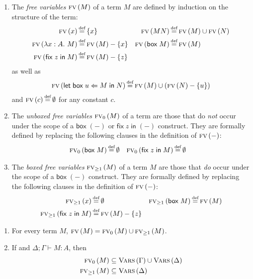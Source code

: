 \documentclass[11pt]{entcs}
\newcommand{\defeq}{\stackrel{\mathclap{\mbox{\tiny def}}}{=}}
\newcommand{\ctxt}[2]{#1\mathbin{;}#2}
\newcommand{\ibox}[1]{\mathsf{box\;}#1}
\newcommand{\letbox}[3]{\mathsf{let\;box\;} #1 \Leftarrow #2 \mathsf{\;in\;} #3}
\newcommand{\fixlob}[2]{\mathsf{fix\;} #1 \mathsf{\;in\;} #2}
\newcommand{\fv}[1]{\textsc{fv}\left(#1\right)}
\newcommand{\ufv}[1]{\textsc{fv}_0\left(#1\right)}
\newcommand{\bfv}[1]{\textsc{fv}_{\geq 1}\left(#1\right)}
\newcommand{\vars}[1]{\textsc{Vars}\left(#1\right)}
\begin{document}
\begin{defn} \hfill
  \begin{enumerate}
    \item The \emph{free variables} $\fv{M}$ of a term
    $M$ are defined by induction on the structure of the term:
    \begin{align*}
      \fv{x}  &\defeq \{x\} &
      \fv{MN} &\defeq \fv{M} \cup \fv{N} \\
      \fv{\lambda x : A.\ M} &\defeq \fv{M} - \{x\} &
      \fv{\ibox{M}} &\defeq \fv{M} \\
      \fv{\fixlob{z}{M}} &\defeq \fv{M} - \{z\}
    \end{align*}
    as well as \[
      \fv{\letbox{u}{M}{N}} \defeq \fv{M} \cup \left(\fv{N} - \{u\}\right)
    \] and $\fv{c} \defeq \emptyset$ for any constant $c$.

    \item The \emph{unboxed free variables} $\ufv{M}$ of a term
    are those that do \emph{not} occur under the scope of a
    $\ibox{(-)}$ or $\fixlob{z}{(-)}$ construct. They are formally
    defined by replacing the following clauses in the definition
    of $\fv{-}$:
    \begin{align*}
      \ufv{\ibox{M}} &\defeq \emptyset &
      \ufv{\fixlob{z}{M}} &\defeq \emptyset
    \end{align*}

    \item The \emph{boxed free variables} $\bfv{M}$ of a term $M$
    are those that \emph{do} occur under the scope of a
    $\ibox{(-)}$ construct. They are formally defined by replacing
    the following clauses in the definition of $\fv{-}$:
    \begin{align*}
      \bfv{x} &\defeq \emptyset &
      \bfv{\ibox{M}} &\defeq \fv{M} \\
      \bfv{\fixlob{z}{M}} &\defeq \fv{M} - \{z\}
    \end{align*}
  \end{enumerate}
\end{defn}

\begin{thm} \hfill
  \label{thm:freevar}
  \begin{enumerate}

    \item For every term $M$, $\fv{M} = \ufv{M} \cup \bfv{M}$.

    \item If and $\ctxt{\Delta}{\Gamma} \vdash M : A$, then
      \begin{align*}
	\ufv{M} &\subseteq \vars{\Gamma} \cup \vars{\Delta} \\
\bfv{M} &\subseteq \vars{\Delta}
     \end{align*}

  \end{enumerate}
\end{thm}
\end{document}
